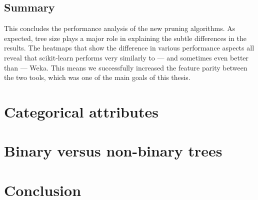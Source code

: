 \subsection{Summary}
This concludes the performance analysis of the new pruning algorithms. As expected, tree size plays a major role in explaining the subtle differences in the results. The heatmaps that show the difference in various performance aspects all reveal that scikit-learn performs very similarly to --- and sometimes even better than --- Weka. This means we successfully increased the feature parity between the two tools, which was one of the main goals of this thesis.

\section{Categorical attributes}

\section{Binary versus non-binary trees}

\section{Conclusion}
